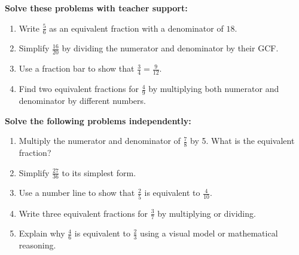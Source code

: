 \documentclass[12pt]{article}
\begin{document}
\begin{tcolorbox}[colframe=black!60, colback=white, 
coltitle=black, colbacktitle=black!15, fonttitle=\bfseries\Large, 
title=Guided Practice, halign title=center, left=10pt, right=10pt, top=10pt, bottom=100pt]
\textbf{Solve these problems with teacher support:}
\begin{enumerate}[itemsep=3em]
    \item Write \( \frac{5}{6} \) as an equivalent fraction with a denominator of \( 18 \). \vspace{1cm}
    \item Simplify \( \frac{16}{20} \) by dividing the numerator and denominator by their GCF. \vspace{1cm}
    \item Use a fraction bar to show that \( \frac{3}{4} = \frac{9}{12} \). \vspace{1cm}
    \item Find two equivalent fractions for \( \frac{4}{9} \) by multiplying both numerator and denominator by different numbers. 
\end{enumerate}
\end{tcolorbox}

\begin{tcolorbox}[colframe=black!60, colback=white, 
coltitle=black, colbacktitle=black!15, fonttitle=\bfseries\Large, 
title=Independent Practice, halign title=center, left=10pt, right=10pt, top=10pt, bottom=100pt]
\textbf{Solve the following problems independently:}
\begin{enumerate}[itemsep=3em]
    \item Multiply the numerator and denominator of \( \frac{7}{8} \) by 5. What is the equivalent fraction? \vspace{1cm}
    \item Simplify \( \frac{27}{36} \) to its simplest form. \vspace{1cm}
    \item Use a number line to show that \( \frac{2}{5} \) is equivalent to \( \frac{4}{10} \). \vspace{1cm}
    \item Write three equivalent fractions for \( \frac{3}{7} \) by multiplying or dividing. \vspace{1cm}
    \item Explain why \( \frac{4}{6} \) is equivalent to \( \frac{2}{3} \) using a visual model or mathematical reasoning.
\end{enumerate}
\end{tcolorbox}
\end{document}
